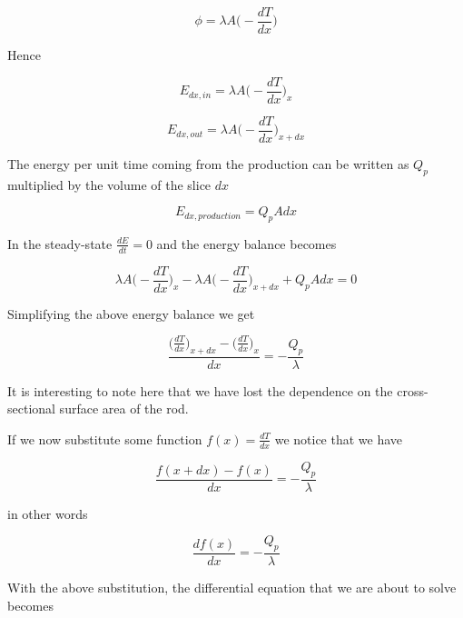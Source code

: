 \documentclass[10pt]{article}
\begin{document}
\begin{equation}
\phi = \lambda A \Big(- \frac{dT}{dx} \Big)
\label{eq:fourier}
\end{equation}

Hence

\begin{equation}
E_{dx, in} = \lambda A \Big(- \frac{dT}{dx} \Big)_x
\end{equation}

\begin{equation}
E_{dx, out} = \lambda A \Big(- \frac{dT}{dx} \Big)_{x + dx}
\end{equation}

\newpage

The energy per unit time coming from the production can be written as $Q_p$ multiplied by the volume of the slice $dx$

\begin{equation}
E_{dx, production} = Q_p A dx
\end{equation}

In the steady-state $\frac{dE}{dt} = 0$ and the energy balance becomes

\begin{equation}
\lambda A \Big(- \frac{dT}{dx} \Big)_x - \lambda A \Big(- \frac{dT}{dx} \Big)_{x + dx} + Q_p A dx = 0
\end{equation}

Simplifying the above energy balance we get

\begin{equation*}
\frac{\Big(\frac{dT}{dx} \Big)_{x + dx} - \Big(\frac{dT}{dx} \Big)_x  }{dx} = - \frac{Q_p}{\lambda}
\end{equation*}

It is interesting to note here that we have lost the dependence on the cross-sectional surface area of the rod.

If we now substitute some function $f(x) = \frac{dT}{dx}$ we notice that we have

\begin{equation*}
\frac{f(x + dx) - f(x)}{dx} = - \frac{Q_p}{\lambda}
\end{equation*}

in other words

\begin{equation}
\frac{df(x)}{dx} = - \frac{Q_p}{\lambda}
\end{equation}

With the above substitution, the differential equation that we are about to solve becomes
\end{document}
